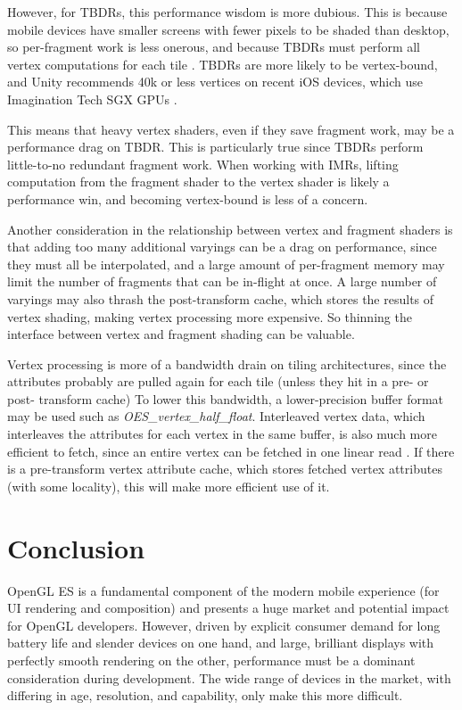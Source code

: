 However, for TBDRs, this performance wisdom is more dubious.  This is because
mobile devices have smaller screens with fewer pixels to be shaded than
desktop, so per-fragment work is less onerous, and because TBDRs must perform
all vertex computations for each tile \cite{Apple11}.  TBDRs are more likely to
be vertex-bound, and Unity recommends 40k or less vertices on recent iOS
devices, which use Imagination Tech SGX GPUs \cite{Unity11}.

This means that heavy vertex shaders, even if they save fragment work, may be a
performance drag on TBDR.  This is particularly true since TBDRs perform
little-to-no redundant fragment work.  When working with IMRs, lifting
computation from the fragment shader to the vertex shader is likely a
performance win, and becoming vertex-bound is less of a concern.

Another consideration in the relationship between vertex and fragment shaders
is that adding too many additional varyings can be a drag on performance, since
they must all be interpolated, and a large amount of per-fragment memory may
limit the number of fragments that can be in-flight at once.  A large number of
varyings may also thrash the post-transform cache, which stores the results of
vertex shading, making vertex processing more expensive.  So thinning the
interface between vertex and fragment shading can be valuable.

Vertex processing is more of a bandwidth drain on tiling architectures, since
the attributes probably are pulled again for each tile (unless they hit in a
pre- or post- transform cache)  To lower this bandwidth, a lower-precision
buffer format may be used such as \textit{OES\_vertex\_half\_float}.
Interleaved vertex data, which interleaves the attributes for each vertex in
the same buffer, is also much more efficient to fetch, since an entire vertex
can be fetched in one linear read \cite{Apple11}.  If there is a pre-transform
vertex attribute cache, which stores fetched vertex attributes (with some
locality), this will make more efficient use of it.

\section{Conclusion}\label{Jon-McCaffrey-Conclusion}

OpenGL ES is a fundamental component of the modern mobile experience (for UI
rendering and composition) \cite{Guy11} and presents a huge market and
potential impact for OpenGL developers.  However, driven by explicit consumer
demand for long battery life and slender devices on one hand, and large,
brilliant displays with perfectly smooth rendering on the other, performance
must be a dominant consideration during development.  The wide range of devices
in the market, with differing in age, resolution, and capability, only make
this more difficult.

